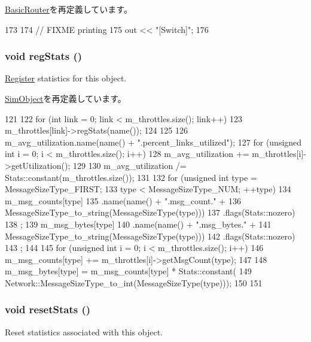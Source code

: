 \hyperlink{classBasicRouter_ac55fe386a101fbae38c716067c9966a0}{BasicRouter}を再定義しています。


\begin{DoxyCode}
173 {
174     // FIXME printing
175     out << "[Switch]";
176 }
\end{DoxyCode}
\hypertarget{classSwitch_a4dc637449366fcdfc4e764cdf12d9b11}{
\subsubsection[{regStats}]{\setlength{\rightskip}{0pt plus 5cm}void regStats ()}}
\label{classSwitch_a4dc637449366fcdfc4e764cdf12d9b11}
\hyperlink{classRegister}{Register} statistics for this object. 

\hyperlink{classSimObject_a4dc637449366fcdfc4e764cdf12d9b11}{SimObject}を再定義しています。


\begin{DoxyCode}
121 {
122     for (int link = 0; link < m_throttles.size(); link++) {
123         m_throttles[link]->regStats(name());
124     }
125 
126     m_avg_utilization.name(name() + ".percent_links_utilized");
127     for (unsigned int i = 0; i < m_throttles.size(); i++) {
128         m_avg_utilization += m_throttles[i]->getUtilization();
129     }
130     m_avg_utilization /= Stats::constant(m_throttles.size());
131 
132     for (unsigned int type = MessageSizeType_FIRST;
133          type < MessageSizeType_NUM; ++type) {
134         m_msg_counts[type]
135             .name(name() + ".msg_count." +
136                 MessageSizeType_to_string(MessageSizeType(type)))
137             .flags(Stats::nozero)
138             ;
139         m_msg_bytes[type]
140             .name(name() + ".msg_bytes." +
141                 MessageSizeType_to_string(MessageSizeType(type)))
142             .flags(Stats::nozero)
143             ;
144 
145         for (unsigned int i = 0; i < m_throttles.size(); i++) {
146             m_msg_counts[type] += m_throttles[i]->getMsgCount(type);
147         }
148         m_msg_bytes[type] = m_msg_counts[type] * Stats::constant(
149                 Network::MessageSizeType_to_int(MessageSizeType(type)));
150     }
151 }
\end{DoxyCode}
\hypertarget{classSwitch_a65880e61108132689a1bd769b9187fb7}{
\subsubsection[{resetStats}]{\setlength{\rightskip}{0pt plus 5cm}void resetStats ()}}
\label{classSwitch_a65880e61108132689a1bd769b9187fb7}
Reset statistics associated with this object. 


